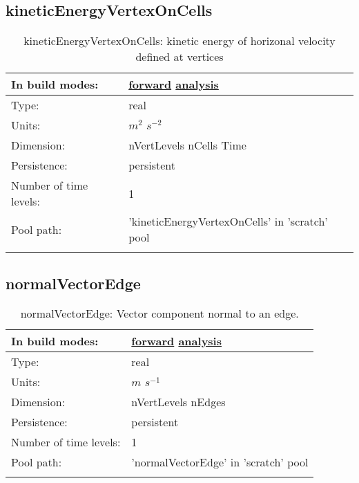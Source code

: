 \subsection[kineticEnergyVertexOnCells]{kineticEnergyVertexOnCells}
\label{subsec:var_sec_scratch_kineticEnergyVertexOnCells}
\begin{center}
\begin{longtable}{| p{2.0in} | p{4.0in} |}
        \hline 
        In build modes: & \hyperref[subsec:forward_var_tab_scratch]{forward} \hyperref[subsec:analysis_var_tab_scratch]{analysis} \\
        \hline 
        Type: & real \\
        \hline 
        Units: & $m^2$ $s^{-2}$ \\
        \hline 
        Dimension: & nVertLevels nCells Time \\
        \hline 
        Persistence: & persistent \\
        \hline 
        Number of time levels: & 1 \\
        \hline 
            Pool path: & 'kineticEnergyVertexOnCells' in 'scratch' pool
 \\
		 \hline 
    \caption{kineticEnergyVertexOnCells: kinetic energy of horizonal velocity defined at vertices}
\end{longtable}
\end{center}
\subsection[normalVectorEdge]{normalVectorEdge}
\label{subsec:var_sec_scratch_normalVectorEdge}
\begin{center}
\begin{longtable}{| p{2.0in} | p{4.0in} |}
        \hline 
        In build modes: & \hyperref[subsec:forward_var_tab_scratch]{forward} \hyperref[subsec:analysis_var_tab_scratch]{analysis} \\
        \hline 
        Type: & real \\
        \hline 
        Units: & $m$ $s^{-1}$ \\
        \hline 
        Dimension: & nVertLevels nEdges \\
        \hline 
        Persistence: & persistent \\
        \hline 
        Number of time levels: & 1 \\
        \hline 
            Pool path: & 'normalVectorEdge' in 'scratch' pool
 \\
		 \hline 
    \caption{normalVectorEdge: Vector component normal to an edge.}
\end{longtable}
\end{center}
